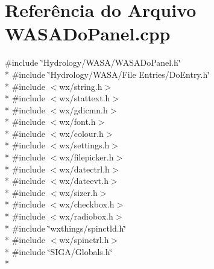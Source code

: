 \section{Referência do Arquivo W\+A\+S\+A\+Do\+Panel.\+cpp}
\label{_w_a_s_a_do_panel_8cpp}
{\ttfamily \#include \char`\"{}Hydrology/\+W\+A\+S\+A/\+W\+A\+S\+A\+Do\+Panel.\+h\char`\"{}}\\*
{\ttfamily \#include \char`\"{}Hydrology/\+W\+A\+S\+A/\+File Entries/\+Do\+Entry.\+h\char`\"{}}\\*
{\ttfamily \#include $<$wx/string.\+h$>$}\\*
{\ttfamily \#include $<$wx/stattext.\+h$>$}\\*
{\ttfamily \#include $<$wx/gdicmn.\+h$>$}\\*
{\ttfamily \#include $<$wx/font.\+h$>$}\\*
{\ttfamily \#include $<$wx/colour.\+h$>$}\\*
{\ttfamily \#include $<$wx/settings.\+h$>$}\\*
{\ttfamily \#include $<$wx/filepicker.\+h$>$}\\*
{\ttfamily \#include $<$wx/datectrl.\+h$>$}\\*
{\ttfamily \#include $<$wx/dateevt.\+h$>$}\\*
{\ttfamily \#include $<$wx/sizer.\+h$>$}\\*
{\ttfamily \#include $<$wx/checkbox.\+h$>$}\\*
{\ttfamily \#include $<$wx/radiobox.\+h$>$}\\*
{\ttfamily \#include \char`\"{}wxthings/spinctld.\+h\char`\"{}}\\*
{\ttfamily \#include $<$wx/spinctrl.\+h$>$}\\*
{\ttfamily \#include \char`\"{}S\+I\+G\+A/\+Globals.\+h\char`\"{}}\\*
